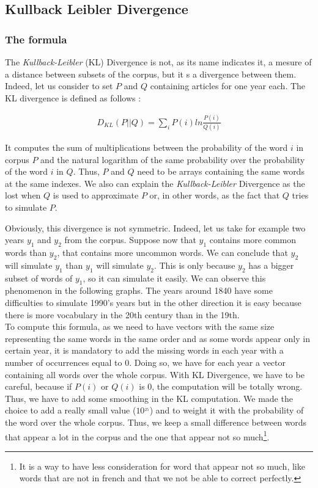 \subsection{Kullback Leibler Divergence}

\subsubsection{The formula}
The \emph{Kullback-Leibler} (KL) Divergence is not, as its name indicates it, a mesure of a distance between subsets of the corpus, but it s a divergence between them. Indeed, let us consider to set $P$ and $Q$ containing articles for one year each. The KL divergence is defined as follows :

\begin{eqnarray}\label{KL}
    D_{KL}(P||Q) = \sum_i P(i) ln \frac{P(i)}{Q(i)}
\end{eqnarray}

It computes the sum of multiplications between the probability of the word $i$ in corpus $P$ and the natural logarithm of the same probability over the probability of the word $i$ in $Q$. Thus, $P$ and $Q$ need to be arrays containing the same words at the same indexes. We also can explain the \emph{Kullback-Leibler} Divergence as the lost when $Q$ is used to approximate $P$ or, in other words, as the fact that $Q$ tries to simulate $P$.

Obviously, this divergence is not symmetric. Indeed, let us take for example two years $y_1$ and $y_2$ from the corpus. Suppose now that $y_1$ contains more common words than $y_2$, that contains more uncommon words. We can conclude that $y_2$ will simulate $y_1$ than $y_1$ will simulate $y_2$. This is only because $y_2$ has a bigger subset of words of $y_1$, so it can simulate it easily. We can observe this phenomenon in the following graphs. The years around 1840 have some difficulties to simulate 1990's years but in the other direction it is easy because there is more vocabulary in the 20th century than in the 19th.\\

To compute this formula, as we need to have vectors with the same size representing the same words in the same order and as some words appear only in certain year, it is mandatory to add the missing words in each year with a number of occurrences equal to 0. Doing so, we have for each year a vector containing all words over the whole corpus. With KL Divergence, we have to be careful, because if $P(i)$ or $Q(i)$ is 0, the computation will be totally wrong. Thus, we have to add some smoothing in the KL computation. We made the choice to add a really small value ($10^{_25}$) and to weight it with the probability of the word over the whole corpus. Thus, we keep a small difference between words that appear a lot in the corpus and the one that appear not so much\footnote{It is a way to have less consideration for word that appear not so much, like words that are not in french and that we not be able to correct perfectly.}.

